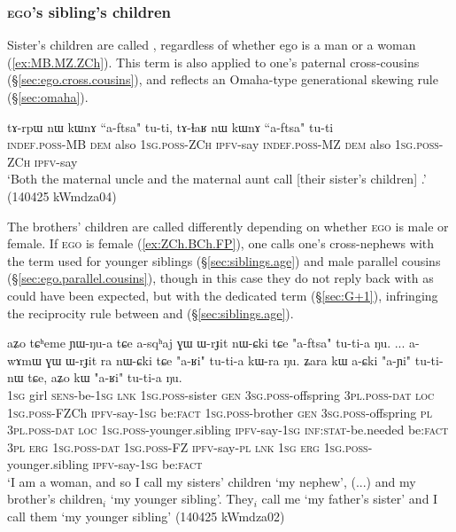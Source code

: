 \subsubsection{\textsc{ego}'s sibling's children} \label{sec:nephews}
Sister's children are called , regardless of whether ego is a man or a woman (\ref{ex:MB.MZ.ZCh}). This term is also applied to one's paternal cross-cousins (§\ref{sec:ego.cross.cousins}), and reflects an Omaha-type generational skewing rule (§\ref{sec:omaha}).

\begin{exe}
\ex \label{ex:MB.MZ.ZCh}
\gll tɤ-rpɯ nɯ kɯnɤ ``a-ftsa" tu-ti, tɤ-ɬaʁ nɯ kɯnɤ ``a-ftsa" tu-ti \\
\textsc{indef}.\textsc{poss}-MB \textsc{dem} also \textsc{1sg}.\textsc{poss}-\textsc{ZCh} \textsc{ipfv}-say \textsc{indef}.\textsc{poss}-MZ \textsc{dem} also \textsc{1sg}.\textsc{poss}-\textsc{ZCh} \textsc{ipfv}-say \\
\glt `Both the maternal uncle and the maternal aunt call [their sister's children] .'  (140425 kWmdza04)
\end{exe}

The brothers' children are called differently depending on whether \textsc{ego} is male or female. If \textsc{ego} is female (\ref{ex:ZCh.BCh.FP}), one calls one's cross-nephews with the term  used for younger siblings (§\ref{sec:siblings.age}) and male parallel cousins (§\ref{sec:ego.parallel.cousins}), though in this case they do not reply back with  as could have been expected, but with the dedicated term  (§\ref{sec:G+1}), infringing the reciprocity rule between  and  (§\ref{sec:siblings.age}).


\begin{exe}
\ex \label{ex:ZCh.BCh.FP}
\gll aʑo tɕʰeme ɲɯ-ŋu-a tɕe a-sqʰaj ɣɯ ɯ-rɟit nɯ-ɕki tɕe "a-ftsa" tu-ti-a ŋu.
... a-wɤmɯ ɣɯ ɯ-rɟit ra nɯ-ɕki tɕe "a-ʁi" tu-ti-a kɯ-ra ŋu. ʑara kɯ a-ɕki "a-ɲi" tu-ti-nɯ tɕe, aʑo kɯ "a-ʁi" tu-ti-a ŋu. \\
\textsc{1sg} girl \textsc{sens}-be-\textsc{1sg} \textsc{lnk} \textsc{1sg}.\textsc{poss}-sister \textsc{gen} \textsc{3sg}.\textsc{poss}-offspring \textsc{3pl}.\textsc{poss}-\textsc{dat} \textsc{loc}  \textsc{1sg}.\textsc{poss}-FZCh \textsc{ipfv}-say-\textsc{1sg} be:\textsc{fact} { } \textsc{1sg}.\textsc{poss}-brother \textsc{gen} \textsc{3sg}.\textsc{poss}-offspring \textsc{pl} \textsc{3pl}.\textsc{poss}-\textsc{dat} \textsc{loc} \textsc{1sg}.\textsc{poss}-younger.sibling \textsc{ipfv}-say-\textsc{1sg} \textsc{inf}:\textsc{stat}-be.needed be:\textsc{fact} \textsc{3pl} \textsc{erg} \textsc{1sg}.\textsc{poss}-\textsc{dat} \textsc{1sg}.\textsc{poss}-FZ \textsc{ipfv}-say-\textsc{pl} \textsc{lnk} \textsc{1sg} \textsc{erg} \textsc{1sg}.\textsc{poss}-younger.sibling \textsc{ipfv}-say-\textsc{1sg} be:\textsc{fact} \\
\glt `I am a woman, and so I call my sisters' children  `my nephew', (...) and my brother's children$_i$  `my younger sibling'. They$_i$ call me  `my father's sister' and I call them  `my younger sibling' (140425 kWmdza02)
\end{exe}

